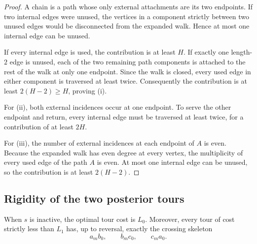 \begin{proof}
A chain is a path whose only external attachments are its two endpoints.  If
two internal edges were unused, the vertices in a component strictly between
two unused edges would be disconnected from the expanded walk.  Hence at most
one internal edge can be unused.

If every internal edge is used, the contribution is at least $H$.  If exactly
one length-$2$ edge is unused, each of the two remaining path components is
attached to the rest of the walk at only one endpoint.  Since the walk is
closed, every used edge in either component is traversed at least twice.
Consequently the contribution is at least $2(H-2)\ge H$, proving (i).

For (ii), both external incidences occur at one endpoint.  To serve the other
endpoint and return, every internal edge must be traversed at least twice, for
a contribution of at least $2H$.

For (iii), the number of external incidences at each endpoint of $A$ is even.
Because the expanded walk has even degree at every vertex, the multiplicity of
every used edge of the path $A$ is even.  At most one internal edge can be
unused, so the contribution is at least $2(H-2)$.
\end{proof}

\subsection{Rigidity of the two posterior tours}

\begin{lemma}\label{lem:inactive-rigidity}
When $s$ is inactive, the optimal tour cost is $L_0$.  Moreover, every tour of
cost strictly less than $L_1$ has, up to reversal, exactly the crossing
skeleton
\begin{equation}\label{eq:inactive-skeleton}
  a_mb_0,
  \qquad
  b_mc_0,
  \qquad
  c_ma_0.
\end{equation}
\end{lemma}


